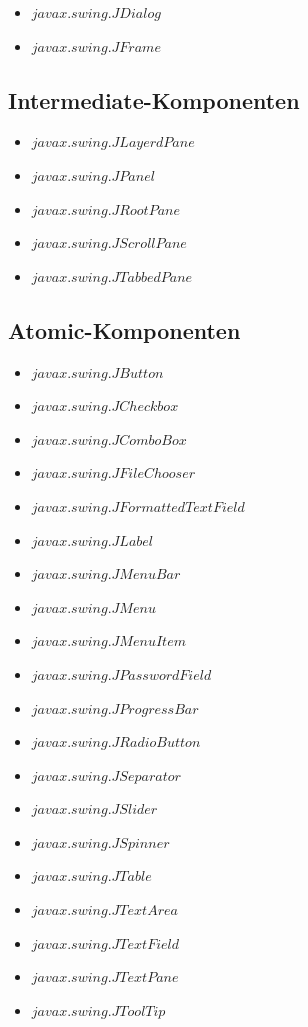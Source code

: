   \begin{itemize}
    \item \(javax.swing.JDialog\)
    \item \(javax.swing.JFrame\)
  \end{itemize}
  
  \subsection{Intermediate-Komponenten}
  
  \begin{itemize}
    \item \(javax.swing.JLayerdPane\)
    \item \(javax.swing.JPanel\)
    \item \(javax.swing.JRootPane\)
    \item \(javax.swing.JScrollPane\)
    \item \(javax.swing.JTabbedPane\)
  \end{itemize}
  
  \subsection{Atomic-Komponenten}
  
  \begin{itemize}
    \item \(javax.swing.JButton\)
    \item \(javax.swing.JCheckbox\)
    \item \(javax.swing.JComboBox\)
    \item \(javax.swing.JFileChooser\)
    \item \(javax.swing.JFormattedTextField\)
    \item \(javax.swing.JLabel\)
    \item \(javax.swing.JMenuBar\)
    \item \(javax.swing.JMenu\)
    \item \(javax.swing.JMenuItem\)
    \item \(javax.swing.JPasswordField\)
    \item \(javax.swing.JProgressBar\)
    \item \(javax.swing.JRadioButton\)
    \item \(javax.swing.JSeparator\)
    \item \(javax.swing.JSlider\)
    \item \(javax.swing.JSpinner\)
    \item \(javax.swing.JTable\)
    \item \(javax.swing.JTextArea\)
    \item \(javax.swing.JTextField\)
    \item \(javax.swing.JTextPane\)
    \item \(javax.swing.JToolTip\)
  \end{itemize}
  
